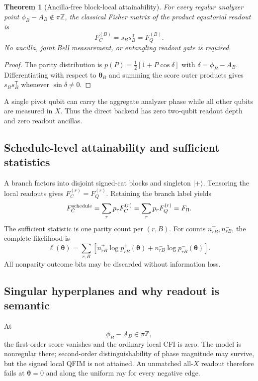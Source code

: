 \documentclass[11pt]{article}
\newtheorem{theorem}{Theorem}[section]
\theoremstyle{definition}
\theoremstyle{remark}
\newcommand{\PiProg}{\mathsf{\Pi}}
\newcommand{\ket}[1]{\lvert #1\rangle}
\begin{document}
\begin{theorem}[Ancilla-free block-local attainability]
\label{thm:block-local-attainment}
For every regular analyzer point $\phi_B-A_B\notin\pi\mathbb Z$, the classical Fisher matrix of the product equatorial readout is
\begin{equation}
  F_C^{(B)}=s_Bs_B^{\mathsf T}=F_Q^{(B)}.
  \label{eq:block-attainment}
\end{equation}
No ancilla, joint Bell measurement, or entangling readout gate is required.
\end{theorem}
\begin{proof}
The parity distribution is $p(P)=\tfrac12[1+P\cos\delta]$ with $\delta=\phi_B-A_B$. Differentiating with respect to $\bm\theta_B$ and summing the score outer products gives $s_Bs_B^{\mathsf T}$ whenever $\sin\delta\ne0$.
\end{proof}
A single pivot qubit can carry the aggregate analyzer phase while all other qubits are measured in $X$. Thus the direct backend has zero two-qubit readout depth and zero readout ancillas.

\subsection{Schedule-level attainability and sufficient statistics}
A branch factors into disjoint signed-cat blocks and singleton $\ket+$. Tensoring the local readouts gives $F_C^{(r)}=F_Q^{(r)}$. Retaining the branch label yields
\begin{equation}
  F_C^{\rm schedule}=\sum_rp_rF_C^{(r)}=\sum_rp_rF_Q^{(r)}=F_{\PiProg}.
  \label{eq:schedule-attainment}
\end{equation}
The sufficient statistic is one parity count per $(r,B)$. For counts $n^+_{rB},n^-_{rB}$, the complete likelihood is
\begin{equation}
  \ell(\bm\theta)=
  \sum_{r,B}\left[n^+_{rB}\log p^+_{rB}(\bm\theta)
  +n^-_{rB}\log p^-_{rB}(\bm\theta)\right].
  \label{eq:parity-likelihood}
\end{equation}
All nonparity outcome bits may be discarded without information loss.

\subsection{Singular hyperplanes and why readout is semantic}
At
\begin{equation}
  \phi_B-A_B\in\pi\mathbb Z,
  \label{eq:readout-singular-hyperplanes}
\end{equation}
the first-order score vanishes and the ordinary local CFI is zero. The model is nonregular there; second-order distinguishability of phase magnitude may survive, but the signed local QFIM is not attained. An unmatched all-$X$ readout therefore fails at $\bm\theta=0$ and along the uniform ray for every negative edge.
\end{document}
